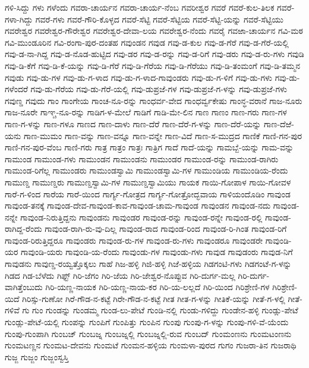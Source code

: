 ಗಳಿ-ಸಿದ್ದು
ಗಳು
ಗಳೆಂದು
ಗವರಾ-ಚಾರ್ಯನ
ಗವರಾ-ಚಾರ್ಯ-ನೆಂಬ
ಗವರೀಶ್ವರ
ಗವರೆ
ಗವರೆ-ಕುಲ-ತಿಲಕ
ಗವರೆ-ಗಳಾ-ಗಿದ್ದು
ಗವರೆ-ಗಳು
ಗವರೆ-ಗೌರಿ-ಕೊಳ್ಳದ
ಗವರೆ-ಸೆಟ್ಟಿ
ಗವರೆ-ಸೆಟ್ಟಿಯ
ಗವರೆ-ಸೆಟ್ಟಿ-ಯನ್ನು
ಗವರೆ-ಸೆಟ್ಟಿಯು
ಗವರೇಶ್ವರ
ಗವರೇಶ್ವರ-ಗೌರೇಶ್ವರ
ಗವರೇಶ್ವರ-ದೇವಾ-ಲಯ
ಗವರೇಶ್ವರ-ನೆಂದು
ಗವರೈ
ಗವಱಾ-ಚಾರ್ಯನ
ಗವಿ-ಮಠ
ಗವಿ-ಮುಂಡೂರಿನ
ಗವಿ-ರಂಗಾ-ಪುರ-ದಂತಹ
ಗವುಂಡನ
ಗವುಡ
ಗವು-ಡ-ಕುಲ
ಗವು-ಡ-ಗೆರೆ
ಗವು-ಡ-ಗೆರೆ-ಯಲ್ಲಿ
ಗವು-ಡ-ನಾ-ಗಿದ್ದ
ಗವು-ಡ-ನೊಡ-ಹುಟ್ಟಿದ
ಗವು-ಡರ
ಗವು-ಡ-ರನ್ನು
ಗವು-ಡ-ರಿಗೆ
ಗವು-ಡರು
ಗವು-ಡ-ರು-ಗಳು
ಗವುಡಿ
ಗವು-ಡಿ-ಕೆಗೆ
ಗವು-ಡಿ-ಕೆ-ಯನ್ನು
ಗವು-ಡಿ-ಗೆರೆ
ಗವು-ಡಿ-ಗೆರೆಯ
ಗವು-ಡಿ-ಗೆರೆಯು
ಗವು-ಡಿ-ತಂಮಂಗೆ
ಗವು-ಡಿ-ತಮ್ಮನ
ಗವುಡು
ಗವು-ಡು-ಗಳ
ಗವು-ಡು-ಗ-ಳಾದ
ಗವು-ಡು-ಗ-ಳಾದ-ಗಾವುಂಡರು
ಗವು-ಡು-ಗ-ಳಿಗೆ
ಗವು-ಡು-ಗಳು
ಗವು-ಡು-ಗಳೆಂದರೆ
ಗವು-ಡು-ಗೆರೆಯ
ಗವು-ಡು-ಗೆರೆ-ಯಲ್ಲಿ
ಗವು-ಡುಪ್ರಜೆ-ಗಳ
ಗವು-ಡುಪ್ರಜೆ-ಗ-ಳನ್ನು
ಗವು-ಡುಪ್ರಜೆ-ಗಳು
ಗವುಣ್ಡ
ಗವುದು
ಗಾಂ
ಗಾಂಗೇಯ
ಗಾಂಚ-ನೂ-ರನ್ನು
ಗಾಂಧರ್ವ-ವೇದ
ಗಾಂಧರ್ವ್ವಕೇಷು
ಗಾಂನ್ಧ-ವರಾನೆ
ಗಾಜ-ನೂರು
ಗಾಜ-ನೂರೇ
ಗಾಞ್ಚ-ನೂ-ರನ್ನು
ಗಾಡಿಗ-ಳ-ಮೇಲೆ
ಗಾಡಿಗೆ
ಗಾಡಿ-ಮೇ-ಲಿನ
ಗಾಣ
ಗಾಣಂ
ಗಾಣ-ಗರು
ಗಾಣ-ಗಳ
ಗಾಣ-ಗ-ಳನ್ನು
ಗಾಣ-ಗಳೂ
ಗಾಣದ
ಗಾಣ-ದಾಳು
ಗಾಣ-ದೆರೆ
ಗಾಣ-ದೆರೆ-ಗ-ಳನ್ನು
ಗಾಣ-ದೆರೆ-ಯನ್ನು
ಗಾಣ-ದೆಱೆ-ಯನು
ಗಾಣ-ಮುಮಂ
ಗಾಣ-ವನ್ನು
ಗಾಣ-ವನ್ನೂ
ಗಾಣ-ವನ್ನೇ
ಗಾಣ-ವಿದೆ
ಗಾಣ-ಸ-ಮುದ್ರದ
ಗಾಣಿಕೆ
ಗಾಣಿ-ಗನ-ಪುರ
ಗಾಣಿ-ಗನ-ಪುರ-ವೆಂಬ
ಗಾಣಿ-ಗರು
ಗಾತ್ರ
ಗಾತ್ರಂ
ಗಾತ್ರಃ
ಗಾತ್ರಿಗ
ಗಾದೆ
ಗಾದೆ-ಯನ್ನು
ಗಾಮಬ್ಬೆ-ಯನ್ನು
ಗಾಮ-ವನ್ನು
ಗಾಮುಂಡ
ಗಾಮುಂಡ-ಗಳು
ಗಾಮುಂಡನ
ಗಾಮುಂಡನು
ಗಾಮುಂಡರ
ಗಾಮುಂಡ-ರನ್ನು
ಗಾಮುಂಡ-ರಾಗಿರು
ಗಾಮುಂಡ-ರಿಗೆಲ್ಲ
ಗಾಮುಂಡರು
ಗಾಮುಂಡಸ್ವಾಮಿ
ಗಾಮುಂಡಸ್ವಾಮಿ-ಗಳ
ಗಾಮುಂಡಿಯ
ಗಾಮುಂಡಿಯ-ರೆಂದು
ಗಾಮುಣ್ಡ
ಗಾಮುಣ್ಡರು
ಗಾಮುಣ್ಡಸ್ವಾಮಿ-ಗಳ
ಗಾಮುಣ್ಡಸ್ವಾಮಿಯು
ಗಾಯಕ
ಗಾಯಿ-ಗೋಪಾಳ
ಗಾಯಿ-ಗೋವಳ
ಗಾರೆ-ಗ-ಳಿಂದ
ಗಾರೆಯ
ಗಾರೆ-ಯಿಂದ
ಗಾರ್ಗ್ಯ-ಗೋತ್ರದ
ಗಾರ್ಗ್ಯ-ಗೋತ್ರೋದ್ಭವಾಯ
ಗಾಳಿಯಂದೊಡಿಂ
ಗಾವುಂಡ
ಗಾವುಂಡ-ತನಕ್ಕೆ
ಗಾವುಂಡ-ದೇವ-ಗಾವುಂಡ-ಕಾವ-ಗಾವುಂಡ-ಚಾಮ-ಗಾವುಂಡ
ಗಾವುಂಡನ
ಗಾವುಂಡ-ನದು
ಗಾವುಂಡ-ನನ್ನೇ
ಗಾವುಂಡ-ನಿರುತ್ತಿದ್ದನು
ಗಾವುಂಡನು
ಗಾವುಂಡರ
ಗಾವುಂಡ-ರನ್ನು
ಗಾವುಂಡ-ರನ್ನೇ
ಗಾವುಂಡ-ರಲ್ಲಿ
ಗಾವುಂಡ-ರಾಗಿದ್ದ-ರೆಂದು
ಗಾವುಂಡ-ರಾಗಿ-ರು-ವು-ದಿಲ್ಲ
ಗಾವುಂಡ-ರಾದ
ಗಾವುಂಡ-ರಿಂದ
ಗಾವುಂಡ-ರಿ-ಗಿಂತ
ಗಾವುಂಡ-ರಿಗೆ
ಗಾವುಂಡ-ರಿರುತ್ತಿದ್ದರೂ
ಗಾವುಂಡರು
ಗಾವುಂಡ-ರು-ಗಳ
ಗಾವುಂಡ-ರು-ಗಳು
ಗಾವುಂಡರೂ
ಗಾವುಂಡರೇ
ಗಾವುಂಡಿ-ಯರ
ಗಾವುಂಡಿ-ಯರು
ಗಾವುಂಡಿ-ಯ-ರೆಂದು
ಗಾವುಂಡು-ಗಳ
ಗಾವುಂಡು-ಗಳು
ಗಾವುಡ
ಗಾವುಡಂರು
ಗಾವುಡ-ನಿಗೆ
ಗಾವುಡನು
ಗಾವುಣ್ಡ-ರಯ್ವತ್ತೊಕ್ಕಲು
ಗಾಹೆ
ಗಿಜ-ಹಳ್ಳಿ
ಗಿಜಿ-ಹಳ್ಳಿ
ಗಿಜೆ-ಹಳ್ಳಿಯ
ಗಿಡಗಂಟಿ-ಗಳು
ಗಿಡಗಂಟೆ-ಗ-ಳನ್ನು
ಗಿಡದ
ಗಿಡ-ಬೆಳೆದು
ಗಿಫ್ಟ್
ಗಿರಿ-ಜೆಗಂ
ಗಿರಿ-ಜೆಯ
ಗಿರಿ-ಜೇಶ್ವರ-ನೊಪ್ಪುವ
ಗಿರಿ-ದುರ್ಗ-ಮಲ್ಲ
ಗಿರಿ-ದುರ್ಗ-ವಾಗಿತ್ತೆಂಬುದು
ಗಿರಿ-ಯಣ್ಣ-ನಾಯಕ
ಗಿರಿ-ಯಣ್ಣ-ನಾಯ-ಕರ
ಗಿರಿ-ಯ-ಲಲ್ಲದೆ
ಗಿರಿ-ಯಿಂದ
ಗಿರಿಶ್ರೇಣಿ-ಗಳ
ಗಿರಿಶ್ರೇಣಿ-ಯಿದೆ
ಗಿರಿಸ್ಸು-ಗುಣೋ
ಗಿರೆ-ಗೌಡ-ನ-ಕಟ್ಟೆ
ಗಿರೇ-ಗೌಡ-ನ-ಕಟ್ಟೆ
ಗೀತ
ಗೀತ-ಗ-ಳನ್ನು
ಗೀತಿಕೆ-ಯನ್ನು
ಗೀತೆ-ಗ-ಳಲ್ಲಿ
ಗೀತೆ-ಗಳಿವೆ
ಗು
ಗುಂ
ಗುಂಡನ್ನು
ಗುಂಡಮ್ಮ
ಗುಂಡ-ಲು-ಪೇಟೆ
ಗುಂಡಿ-ನಲ್ಲಿ
ಗುಂಡು-ಗಳಿದ್ದು
ಗುಂಡೇನ-ಹಳ್ಳಿ
ಗುಂಡ್ಲು-ಪೇಟೆ
ಗುಂಡ್ಲು-ಪೇಟೆ-ಯಲ್ಲಿ
ಗುಂಪನ್ನು
ಗುಂಪಿಗೆ
ಗುಂಪಿತ್ತು
ಗುಂಪಿನ
ಗುಂಪು
ಗುಂಪು-ಗ-ಳನ್ನು
ಗುಂಪು-ಗಳಿ-ವೆ-ಯೆಂದು
ಗುಂಪು-ಗುಂಪಾಗಿ
ಗುಂಬಜ್
ಗುಂಬಜ್ನ
ಗುಂಬಜ್ನಲ್ಲಿ
ಗುಂಬಜ್ನಲ್ಲಿ-ರುವ
ಗುಂಬದ್
ಗುಂಮಂಣನು
ಗುಂಮಟಂಣನು
ಗುಂಮಟಣ್ಣನ
ಗುಂಮಟ-ದೇವನು
ಗುಂಮಟೆ
ಗುಂಮನ-ಹಳ್ಳಿಯ
ಗುಂಮಳಾ-ಪುರದ
ಗುಗಂ
ಗುಜರಾ-ತಿನ
ಗುಜರಾಥಿ
ಗುಜ್ಜ
ಗುಜ್ಜಂ
ಗುಜ್ಜಂಸ್ವಸ್ತಿ
